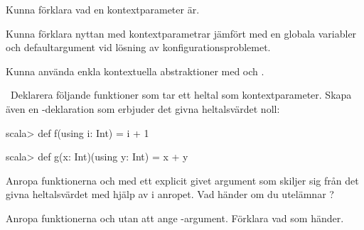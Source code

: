 

\ifPreSolution

\Exercise{\ExeWeekELEVEN}\label{exe:W11}

\begin{Goals}
\item Kunna förklara vad en kontextparameter är. 
\item Kunna förklara nyttan med kontextparametrar jämfört med en globala variabler och defaultargument vid lösning av konfigurationsproblemet.
\item Kunna använda enkla kontextuella abstraktioner med  och .

\end{Goals}

\begin{Preparations}
\item {}
\end{Preparations}

\BasicTasks %

\else

\ExerciseSolution{\ExeWeekELEVEN}

\BasicTasks %

\fi


\QUESTBEGIN

\Task  \what~Deklarera följande funktioner som tar ett heltal som kontextparameter. Skapa även en -deklaration som erbjuder det givna heltalsvärdet noll:
\begin{REPLnonum}
scala> def f(using i: Int) = i + 1

scala> def g(x: Int)(using y: Int) = x + y
\end{REPLnonum}

\Subtask Anropa funktionerna  och  med ett explicit givet argument som skiljer sig från det givna heltalsvärdet med hjälp av  i anropet. Vad händer om du utelämnar ?

\Subtask Anropa funktionerna  och  utan att ange -argument. Förklara vad som händer. 

